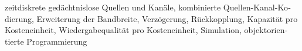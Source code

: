 \kern-2pt
\begin{otherlanguage}{german}
\begin{keywords}
  zeitdiskrete gedächtnislose Quellen und Kanäle, kombinierte
  Quellen-Kanal-Kodierung, Erweiterung der Bandbreite, Verzögerung,
  Rückkopplung, Kapazität pro Kosteneinheit, Wiedergabequalität pro
  Kosteneinheit, Simulation, objektorientierte Programmierung
\end{keywords}
\end{otherlanguage}
